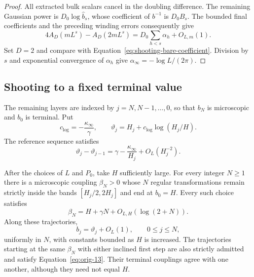 \begin{proof}
All extracted bulk scalars cancel in the doubling difference. The
remaining Gaussian power is $D_0\log\widehat b_s$, whose coefficient of
$b^{-1}$ is $D_0B_s$. The bounded final coefficients and the preceding
winding errors consequently give
\[
 4A_D(mL^s)-A_D(2mL^s)
   =D_0\sum_{h<s}\alpha_h+O_{L,m}(1).
\]
Set $D=2$ and compare with
Equation~\eqref{eq:shooting-bare-coefficient}. Division by $s$ and
exponential convergence of $\alpha_h$ give
$\alpha_\infty=-\log L/(2\pi)$.
\end{proof}

\subsection{Shooting to a fixed terminal value}

The remaining layers are indexed by $j=N,N-1,\ldots,0$, so that
$b_N$ is microscopic and $b_0$ is terminal. Put
\[
 c_{\log}=-\frac{\kappa_\infty}{\gamma},
 \qquad
 \vartheta_j=H_j+c_{\log}\log(H_j/H).
\]
The reference sequence satisfies
\begin{equation}
 \vartheta_j-\vartheta_{j-1}
   =\gamma-\frac{\kappa_\infty}{H_j}+O_L(H_j^{-2}).
 \label{eq:shooting-reference}
\end{equation}

\begin{proposition}
\label{prop:shooting}
After the choices of $L$ and $P_0$, take $H$ sufficiently large. For
every integer $N\ge1$ there is a microscopic coupling $\beta_N>0$
whose $N$ regular transformations remain strictly inside the bands
$[H_j/2,2H_j]$ and end at $b_0=H$. Every such choice satisfies
\begin{equation}
 \beta_N=H+\gamma N+O_{L,H}(\log(2+N)).
 \label{eq:orig-12}
\end{equation}
Along these trajectories,
\begin{equation}
 b_j=\vartheta_j+O_L(1),\qquad 0\le j\le N,
 \label{eq:orig-13}
\end{equation}
uniformly in $N$, with constants bounded as $H$ is increased.
The trajectories starting at the same $\beta_N$ with either inclined
first step are also strictly admitted and satisfy
Equation~\eqref{eq:orig-13}. Their terminal couplings agree with one
another, although they need not equal $H$.
\end{proposition}


